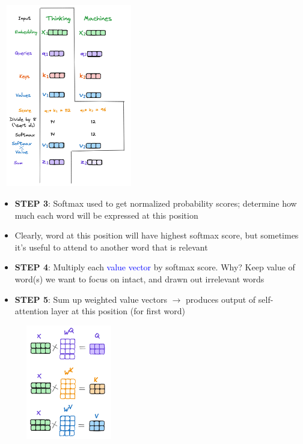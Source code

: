 \documentclass{article}
\begin{document}
\begin{minipage}{0.5\textwidth}
\includegraphics[width=6cm, height=8cm]{Transformer/Images/SelfAttention3.png}
\end{minipage}
\begin{minipage}{0.5\textwidth}
\begin{itemize}
    \item \textbf{STEP 3}: Softmax used to get normalized probability scores; determine how much each word will be expressed at this position
    \item Clearly, word at this position will have highest softmax score, but sometimes it's useful to attend to another word that is relevant
    \item \textbf{STEP 4}: Multiply each \textcolor{blue}{value vector} by softmax score. Why? Keep value of word(s) we want to focus on intact, and drawn out irrelevant words
    \item \textbf{STEP 5}: Sum up weighted value vectors $\rightarrow$  produces output of self-attention layer at this position (for first word)
\end{itemize}
\end{minipage}
\begin{minipage}{0.5\textwidth}
\includegraphics[width=6cm, height=5cm]{Transformer/Images/SelfAttention4.png}
\end{minipage}
\end{document}
